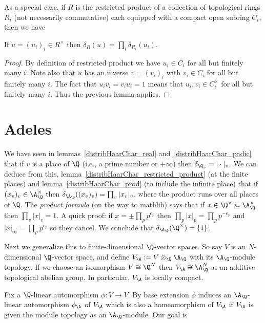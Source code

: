 As a special case, if $R$ is the restricted product of a collection of topological rings $R_i$
  (not necessarily commutative) each equipped with a compact open subring $C_i$, then
  we have

\begin{corollary}
  \label{distribHaarChar_restricted_product}
  If $u=(u_i)_i\in R^\times$ then $\delta_R(u)=\prod_i\delta_{R_i}(u_i)$.
\end{corollary}
\begin{proof}
  By definition of restricted product we have $u_i\in C_i$ for all but finitely many $i$.
  Note also that $u$ has an inverse $v=(v_i)_i$ with $v_i\in C_i$ for all but finitely many $i$.
  The fact that $u_iv_i=v_iu_i=1$ means that $u_i,v_i\in C_i^\times$ for all but finitely many $i$.
  Thus the previous lemma applies.
\end{proof}

\section{Adeles}

  We have seen in lemmas~\ref{distribHaarChar_real} and~\ref{distribHaarChar_padic}
  that if $v$ is a place of $\Q$ (i.e., a prime
  number or $+\infty$) then $\delta_{\Q_v}=|\cdot|_v$.
  We can deduce from this, lemma~\ref{distribHaarChar_restricted_product} (at the finite places)
  and lemma~\ref{distribHaarChar_prod} (to include the infinite place) that if $(x_v)_v\in\A_{\Q}^\times$
  then $\delta_{\A_{\Q}}((x_v)_v)=\prod_v|x_v|_v$, where the product
  runs over all places of $\Q$.
  The \emph{product formula} (on the way to mathlib) says
  that if $x\in\Q^\times\subseteq\A_{\Q}^\times$ then $\prod_v|x|_v=1.$
  A quick proof: if $x=\pm\prod_pp^{e_p}$ then $\prod_p|x|_p=\prod_pp^{-e_p}$
  and $|x|_\infty=\prod_pp^{e_p}$ so they cancel. We conclude that $\delta_{\A_{\Q}}(\Q^\times)=\{1\}$.

  Next we generalize this to
  finite-dimensional $\Q$-vector spaces. So say $V$ is an $N$-dimensional $\Q$-vector space,
  and define $V_{\A}:= V\otimes_{\Q}\A_{\Q}$ with its $\A_{\Q}$-module topology.
  If we choose an isomorphism $V\cong\Q^N$ then $V_{\A}\cong\A_{\Q}^N$
  as an additive topological abelian group. In particular, $V_{\A}$ is locally compact.

  Fix a $\Q$-linear automorphism $\phi:V\to V$. By base extension $\phi$ induces
  an $\A_{\Q}$-linear automorphism $\phi_{\A}$ of $V_{\A}$ which is also a homeomorphism of $V_{\A}$
  if $V_{\A}$ is given the module topology as an $\A_{\Q}$-module. Our goal is

